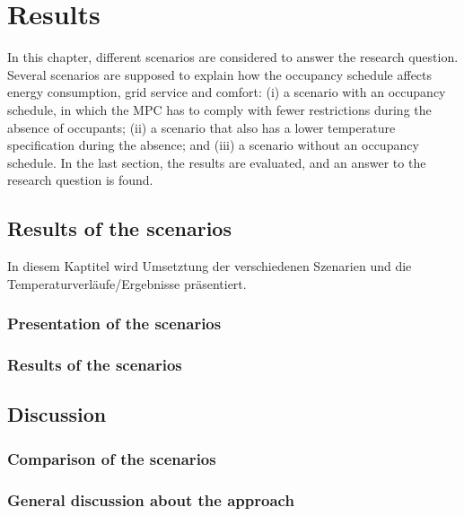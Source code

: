 \chapter{Results}
\label{ch:results}
In this chapter, different scenarios are considered to answer the research question. Several scenarios are supposed to explain how the occupancy schedule affects energy consumption, grid service and comfort: (i) a scenario with an occupancy schedule, in which the MPC has to comply with fewer restrictions during the absence of occupants; (ii) a scenario that also has a lower temperature specification during the absence; and (iii) a scenario without an occupancy schedule. In the last section, the results are evaluated, and an answer to the research question is found.

\section{Results of the scenarios}
\label{sec:ResultsScenarios}
In diesem Kaptitel wird Umsetztung der verschiedenen Szenarien und die Temperaturverläufe/Ergebnisse präsentiert.

\subsection{Presentation of the scenarios}
\label{subsec:Presentation of the scenarios}

\subsection{Results of the scenarios}
\label{subsec:Results of the scenarios}


\section{Discussion}
\label{sec:discussion}

\subsection{Comparison of the scenarios}
\label{subsec:Comparison fo the scenarios}

\subsection{General discussion about the approach}
\label{subsec:General discussion about the approach}

%
